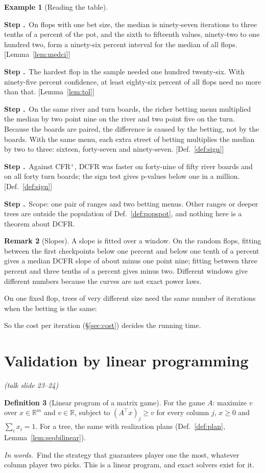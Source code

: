 \documentclass[11pt]{article}
\newcommand{\R}{\mathbb R}\newcommand{\expl}{\mathrm{expl}}
\theoremstyle{definition}
\newtheorem{definition}{Definition}[section]
\newtheorem{example}[definition]{Example}
\newtheorem{remark}[definition]{Remark}
\newcommand{\inwords}{\par\smallskip\noindent\textit{In words.}\ }
\newcounter{stp}
\newcommand{\steps}{\setcounter{stp}{0}}
\newcommand{\st}{\stepcounter{stp}\par\medskip\noindent\textbf{Step \arabic{stp}.}\ }
\newcommand{\by}[1]{\hfill{\small\color{blue!50!black}[#1]}}
\newcommand{\Def}[1]{Def.~\ref{#1}}\newcommand{\Lem}[1]{Lemma~\ref{#1}}\newcommand{\Thm}[1]{Thm.~\ref{#1}}
\newcommand{\slide}[1]{\hfill{\small\itshape (talk slide #1)}}
\begin{document}
\begin{example}[Reading the table]\label{ex:readsample}
\steps
\st On flops with one bet size, the median is ninety-seven iterations to three tenths of a percent of the pot, and the sixth
to fifteenth values, ninety-two to one hundred two, form a ninety-six percent interval for the median of all flops.
\by{\Lem{lem:medci}}
\st The hardest flop in the sample needed one hundred twenty-six. With ninety-five percent confidence, at least eighty-six
percent of all flops need no more than that. \by{\Lem{lem:tol}}
\st On the same river and turn boards, the richer betting menu multiplied the median by two point nine on the river and two
point five on the turn. Because the boards are paired, the difference is caused by the betting, not by the boards. With the
same menu, each extra street of betting multiplies the median by two to three: sixteen, forty-seven and ninety-seven.
\by{\Def{def:sign}}
\st Against CFR$^+$, DCFR was faster on forty-nine of fifty river boards and on all forty turn boards; the sign test gives
p-values below one in a million. \by{\Def{def:sign}}
\st Scope: one pair of ranges and two betting menus. Other ranges or deeper trees are outside the population of
\Def{def:popspot}, and nothing here is a theorem about DCFR.
\end{example}
\begin{center}\small\end{center}

\begin{remark}[Slopes]\label{rem:slopes}
A slope is fitted over a window. On the random flops, fitting between the first checkpoints below one percent and below one
tenth of a percent gives a median DCFR slope of about minus one point nine; fitting between three percent and three tenths of
a percent gives minus two. Different windows give different numbers because the curves are not exact power laws.
\end{remark}

On one fixed flop, trees of very different size need the same number of iterations when the betting is the same:
\begin{center}\end{center}
So the cost per iteration (\S\ref{sec:cost}) decides the running time.

\section{Validation by linear programming}\label{sec:valid}\slide{23--24}
\begin{definition}[Linear program of a matrix game]\label{def:lp}
For the game $A$: maximize $v$ over $x\in\R^m$ and $v\in\R$, subject to $(A^\top x)_j\ge v$ for every column $j$, $x\ge0$ and
$\sum_ix_i=1$. For a tree, the same with realization plans (\Def{def:plan}, \Lem{lem:seqbilinear}).
\inwords Find the strategy that guarantees player one the most, whatever column player two picks. This is a linear
program, and exact solvers exist for it.
\end{definition}
\end{document}
